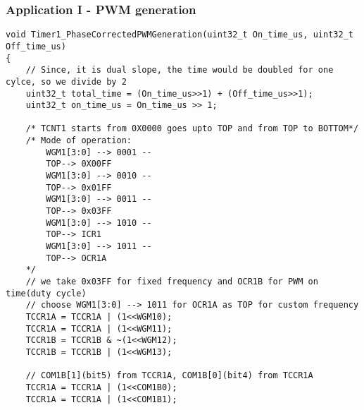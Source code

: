 \subsubsection{Application I - PWM generation}
\begin{verbatim}
void Timer1_PhaseCorrectedPWMGeneration(uint32_t On_time_us, uint32_t Off_time_us)
{
    // Since, it is dual slope, the time would be doubled for one cylce, so we divide by 2
    uint32_t total_time = (On_time_us>>1) + (Off_time_us>>1);
    uint32_t on_time_us = On_time_us >> 1;
        
    /* TCNT1 starts from 0X0000 goes upto TOP and from TOP to BOTTOM*/
    /* Mode of operation:
        WGM1[3:0] --> 0001 --
        TOP--> 0X00FF
        WGM1[3:0] --> 0010 --
        TOP--> 0x01FF
        WGM1[3:0] --> 0011 --
        TOP--> 0x03FF
        WGM1[3:0] --> 1010 --
        TOP--> ICR1
        WGM1[3:0] --> 1011 --
        TOP--> OCR1A
    */
    // we take 0x03FF for fixed frequency and OCR1B for PWM on time(duty cycle)
    // choose WGM1[3:0] --> 1011 for OCR1A as TOP for custom frequency
    TCCR1A = TCCR1A | (1<<WGM10);
    TCCR1A = TCCR1A | (1<<WGM11);
    TCCR1B = TCCR1B & ~(1<<WGM12);
    TCCR1B = TCCR1B | (1<<WGM13);

    // COM1B[1](bit5) from TCCR1A, COM1B[0](bit4) from TCCR1A
    TCCR1A = TCCR1A | (1<<COM1B0);
    TCCR1A = TCCR1A | (1<<COM1B1);
    

\end{verbatim}
